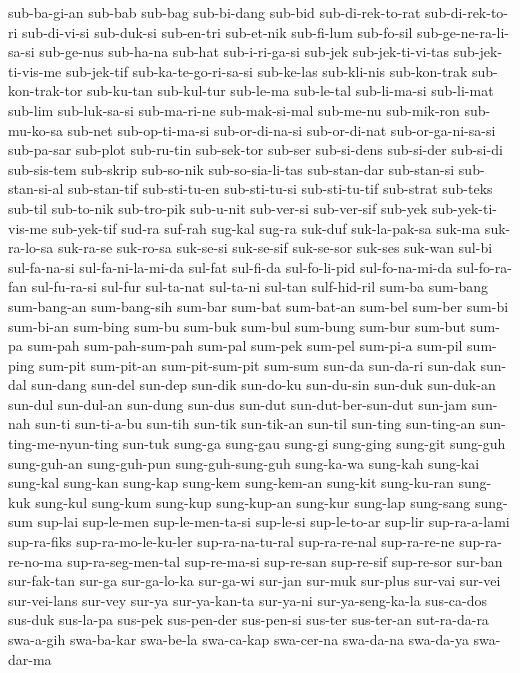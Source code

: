 {sub-ba-gi-an sub-bab sub-bag sub-bi-dang sub-bid sub-di-rek-to-rat
sub-di-rek-to-ri sub-di-vi-si sub-duk-si sub-en-tri sub-et-nik sub-fi-lum
sub-fo-sil sub-ge-ne-ra-li-sa-si sub-ge-nus sub-ha-na sub-hat
sub-i-ri-ga-si sub-jek sub-jek-ti-vi-tas sub-jek-ti-vis-me sub-jek-tif
sub-ka-te-go-ri-sa-si sub-ke-las sub-kli-nis sub-kon-trak sub-kon-trak-tor
sub-ku-tan sub-kul-tur sub-le-ma sub-le-tal sub-li-ma-si sub-li-mat
sub-lim sub-luk-sa-si sub-ma-ri-ne sub-mak-si-mal sub-me-nu sub-mik-ron
sub-mu-ko-sa sub-net sub-op-ti-ma-si sub-or-di-na-si sub-or-di-nat
sub-or-ga-ni-sa-si sub-pa-sar sub-plot sub-ru-tin sub-sek-tor sub-ser
sub-si-dens sub-si-der sub-si-di sub-sis-tem sub-skrip sub-so-nik
sub-so-sia-li-tas sub-stan-dar sub-stan-si sub-stan-si-al sub-stan-tif
sub-sti-tu-en sub-sti-tu-si sub-sti-tu-tif sub-strat sub-teks sub-til
sub-to-nik sub-tro-pik sub-u-nit sub-ver-si sub-ver-sif sub-yek
sub-yek-ti-vis-me sub-yek-tif sud-ra suf-rah sug-kal sug-ra suk-duf
suk-la-pak-sa suk-ma suk-ra-lo-sa suk-ra-se suk-ro-sa suk-se-si suk-se-sif
suk-se-sor suk-ses suk-wan sul-bi sul-fa-na-si sul-fa-ni-la-mi-da sul-fat
sul-fi-da sul-fo-li-pid sul-fo-na-mi-da sul-fo-ra-fan sul-fu-ra-si sul-fur
sul-ta-nat sul-ta-ni sul-tan sulf-hid-ril sum-ba sum-bang sum-bang-an
sum-bang-sih sum-bar sum-bat sum-bat-an sum-bel sum-ber sum-bi sum-bi-an
sum-bing sum-bu sum-buk sum-bul sum-bung sum-bur sum-but sum-pa sum-pah
sum-pah-sum-pah sum-pal sum-pek sum-pel sum-pi-a sum-pil sum-ping sum-pit
sum-pit-an sum-pit-sum-pit sum-sum sun-da sun-da-ri sun-dak sun-dal
sun-dang sun-del sun-dep sun-dik sun-do-ku sun-du-sin sun-duk sun-duk-an
sun-dul sun-dul-an sun-dung sun-dus sun-dut sun-dut-ber-sun-dut sun-jam
sun-nah sun-ti sun-ti-a-bu sun-tih sun-tik sun-tik-an sun-til sun-ting
sun-ting-an sun-ting-me-nyun-ting sun-tuk sung-ga sung-gau sung-gi
sung-ging sung-git sung-guh sung-guh-an sung-guh-pun sung-guh-sung-guh
sung-ka-wa sung-kah sung-kai sung-kal sung-kan sung-kap sung-kem
sung-kem-an sung-kit sung-ku-ran sung-kuk sung-kul sung-kum sung-kup
sung-kup-an sung-kur sung-lap sung-sang sung-sum sup-lai sup-le-men
sup-le-men-ta-si sup-le-si sup-le-to-ar sup-lir sup-ra-a-lami sup-ra-fiks
sup-ra-mo-le-ku-ler sup-ra-na-tu-ral sup-ra-re-nal sup-ra-re-ne
sup-ra-re-no-ma sup-ra-seg-men-tal sup-re-ma-si sup-re-san sup-re-sif
sup-re-sor sur-ban sur-fak-tan sur-ga sur-ga-lo-ka sur-ga-wi sur-jan
sur-muk sur-plus sur-vai sur-vei sur-vei-lans sur-vey sur-ya sur-ya-kan-ta
sur-ya-ni sur-ya-seng-ka-la sus-ca-dos sus-duk sus-la-pa sus-pek
sus-pen-der sus-pen-si sus-ter sus-ter-an sut-ra-da-ra swa-a-gih
swa-ba-kar swa-be-la swa-ca-kap swa-cer-na swa-da-na swa-da-ya swa-dar-ma
}
